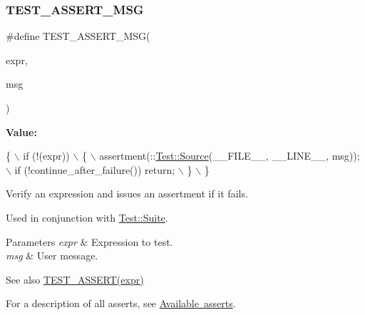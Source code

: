 \mbox{\label{cpptest-assert_8h_ac612ede938734f9c8d898e05818882fb}} 
\subsubsection{\texorpdfstring{T\+E\+S\+T\+\_\+\+A\+S\+S\+E\+R\+T\+\_\+\+M\+SG}{TEST\_ASSERT\_MSG}}
{\footnotesize\ttfamily \#define T\+E\+S\+T\+\_\+\+A\+S\+S\+E\+R\+T\+\_\+\+M\+SG(\begin{DoxyParamCaption}\item[{}]{expr,  }\item[{}]{msg }\end{DoxyParamCaption})}

{\bfseries Value\+:}
\begin{DoxyCode}
\{                                                               \(\backslash\)
        if (!(expr))                                                \(\backslash\)
        \{                                                           \(\backslash\)
            assertment(::\mbox{\hyperlink{class_test_1_1_source}{Test::Source}}(\_\_FILE\_\_, \_\_LINE\_\_, msg));    \(\backslash\)
            if (!continue\_after\_failure()) return;                  \(\backslash\)
        \}                                                           \(\backslash\)
    \}
\end{DoxyCode}
Verify an expression and issues an assertment if it fails.

Used in conjunction with \mbox{\hyperlink{class_test_1_1_suite}{Test\+::\+Suite}}.


\begin{DoxyParams}{Parameters}
{\em expr} & Expression to test. \\
\hline
{\em msg} & User message.\\
\hline
\end{DoxyParams}
\begin{DoxySeeAlso}{See also}
\mbox{\hyperlink{cpptest-assert_8h_a29a763f14098f5574ae5c68291dc6ddd}{T\+E\+S\+T\+\_\+\+A\+S\+S\+E\+R\+T(expr)}}
\end{DoxySeeAlso}
For a description of all asserts, see \mbox{\hyperlink{asserts}{Available asserts}}. 

